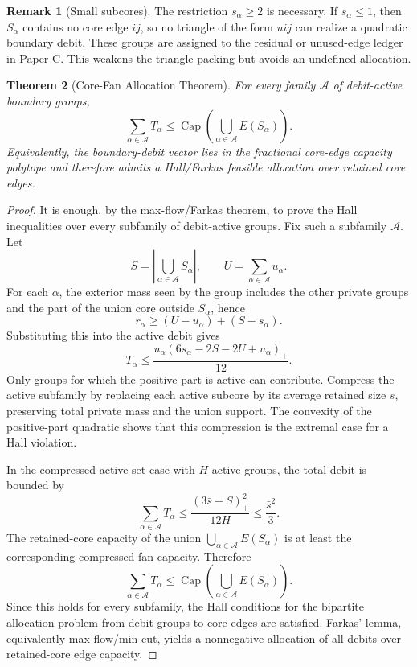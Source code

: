 \documentclass[11pt]{article}
\newtheorem{theorem}{Theorem}[section]
\theoremstyle{definition}
\newtheorem{remark}[theorem]{Remark}
\newcommand{\CoreCap}{\operatorname{Cap}}
\newcommand{\calA}{\mathcal A}
\begin{document}
\begin{remark}[Small subcores]
The restriction \(s_\alpha\ge2\) is necessary. If \(s_\alpha\le1\), then \(S_\alpha\) contains no core edge \(ij\), so no triangle of the form \(uij\) can realize a quadratic boundary debit. These groups are assigned to the residual or unused-edge ledger in Paper C. This weakens the triangle packing but avoids an undefined allocation.
\end{remark}

\begin{theorem}[Core-Fan Allocation Theorem]\label{thm:core-fan}
For every family \(\calA\) of debit-active boundary groups,
\[
    \sum_{\alpha\in\calA}T_\alpha
    \le
    \CoreCap
    \left(
    \bigcup_{\alpha\in\calA}E(S_\alpha)
    \right).
\]
Equivalently, the boundary-debit vector lies in the fractional core-edge capacity polytope and therefore admits a Hall/Farkas feasible allocation over retained core edges.
\end{theorem}

\begin{proof}
It is enough, by the max-flow/Farkas theorem, to prove the Hall inequalities over every subfamily of debit-active groups. Fix such a subfamily \(\calA\). Let
\[
    S=\left|\bigcup_{\alpha\in\calA}S_\alpha\right|,
    \qquad
    U=\sum_{\alpha\in\calA}u_\alpha.
\]
For each \(\alpha\), the exterior mass seen by the group includes the other private groups and the part of the union core outside \(S_\alpha\), hence
\[
    r_\alpha\ge (U-u_\alpha)+(S-s_\alpha).
\]
Substituting this into the active debit gives
\[
    T_\alpha
    \le
    \frac{u_\alpha(6s_\alpha-2S-2U+u_\alpha)_+}{12}.
\]
Only groups for which the positive part is active can contribute. Compress the active subfamily by replacing each active subcore by its average retained size \(\bar s\), preserving total private mass and the union support. The convexity of the positive-part quadratic shows that this compression is the extremal case for a Hall violation.

In the compressed active-set case with \(H\) active groups, the total debit is bounded by
\[
    \sum_{\alpha\in\calA}T_\alpha
    \le
    \frac{(3\bar s-S)_+^2}{12H}
    \le
    \frac{\bar s^2}{3}.
\]
The retained-core capacity of the union \(\bigcup_{\alpha\in\calA}E(S_\alpha)\) is at least the corresponding compressed fan capacity. Therefore
\[
    \sum_{\alpha\in\calA}T_\alpha
    \le
    \CoreCap\left(\bigcup_{\alpha\in\calA}E(S_\alpha)\right).
\]
Since this holds for every subfamily, the Hall conditions for the bipartite allocation problem from debit groups to core edges are satisfied. Farkas' lemma, equivalently max-flow/min-cut, yields a nonnegative allocation of all debits over retained-core edge capacity.
\end{proof}
\end{document}
